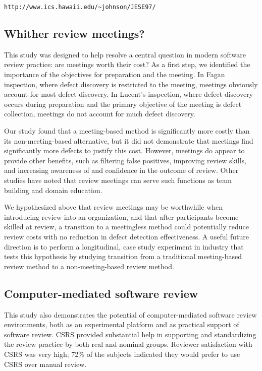 \small
\begin{verbatim}
http://www.ics.hawaii.edu/~johnson/JESE97/
\end{verbatim}
\normalsize


\subsection{Whither review meetings?}

This study was designed to help resolve a central question in modern
software review practice: are meetings worth their cost?  As a first step,
we identified the importance of the objectives for preparation and the
meeting. In Fagan inspection, where defect discovery is restricted to the
meeting, meetings obviously account for most defect discovery. In 
Lucent's inspection, where defect discovery occurs during preparation and the
primary objective of the meeting is defect collection, meetings do not
account for much defect discovery.

Our study found that a meeting-based method is significantly more costly
than its non-meeting-based alternative, but it did not demonstrate that
meetings find significantly more defects to justify this cost. However,
meetings do appear to provide other benefits, such as filtering false
positives, improving review skills, and increasing awareness of
and confidence in the outcome of review.  Other studies have noted that
review meetings can serve such functions as team building and domain education.

We hypothesized above that review meetings may be worthwhile when
introducing review into an organization, and that after participants become
skilled at review, a transition to a meetingless method could potentially
reduce review costs with no reduction in defect detection effectiveness.  A
useful future direction is to perform a longitudinal, case study experiment
in industry that tests this hypothesis by studying transition from a
traditional meeting-based review method to a non-meeting-based review
method.

\subsection{Computer-mediated software review}

This study also demonstrates the potential of computer-mediated software
review environments, both as an experimental platform and as practical
support of software review. CSRS provided substantial help in 
supporting and standardizing the review practice by both real and nominal
groups.  Reviewer satisfaction with CSRS was very high; 72\% of the 
subjects indicated they would prefer to use CSRS over manual review.

